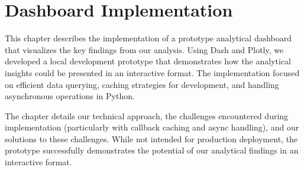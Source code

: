 \chapter{Dashboard Implementation}
\label{ch:dashboard-implementation}

This chapter describes the implementation of a prototype analytical dashboard that visualizes the key findings from our analysis. Using Dash and Plotly, we developed a local development prototype that demonstrates how the analytical insights could be presented in an interactive format. The implementation focused on efficient data querying, caching strategies for development, and handling asynchronous operations in Python.

The chapter details our technical approach, the challenges encountered during implementation (particularly with callback caching and async handling), and our solutions to these challenges. While not intended for production deployment, the prototype successfully demonstrates the potential of our analytical findings in an interactive format.

